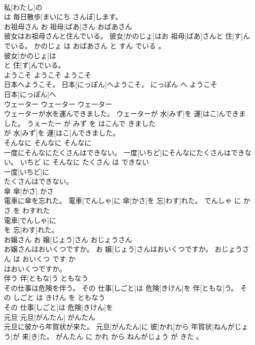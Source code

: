 \documentclass[8pt]{extreport}
\begin{document}
\begin{CJK}{UTF8}{min}
\\	私[わたし]の
\\	は 毎日散歩[まいにち さんぽ]します。			
\\	お祖母さん	お 祖母[ばあ]さん	おばあさん	
\\	彼女はお祖母さんと住んでいる。	彼女[かのじょ]はお 祖母[ばあ]さんと 住[す]んでいる。	かのじょ は おばあさん と すん でいる 。	
\\	彼女[かのじょ]は
\\	と 住[す]んでいる。			
\\	ようこそ	ようこそ	ようこそ	
\\	日本へようこそ。	日本[にっぽん]へようこそ。	にっぽん へ ようこそ	
\\	日本[にっぽん]へ
\\	ウェーター	ウェーター	ウェーター	
\\	ウェーターが水を運んできました。	ウェーターが 水[みず]を 運[はこ]んできました。	うぇーたー が みず を はこんで きました	
\\	が 水[みず]を 運[はこ]んできました。			
\\	そんなに	そんなに	そんなに	
\\	一度にそんなにたくさんはできない。	一度[いちど]にそんなにたくさんはできない。	いちど に そんなに たくさん は できない	
\\	一度[いちど]に
\\	たくさんはできない。			
\\	傘	傘[かさ]	かさ	
\\	電車に傘を忘れた。	電車[でんしゃ]に 傘[かさ]を 忘[わす]れた。	でんしゃ に かさ を わすれた	
\\	電車[でんしゃ]に
\\	を 忘[わす]れた。			
\\	お嬢さん	お 嬢[じょう]さん	おじょうさん	
\\	お嬢さんはおいくつですか。	お 嬢[じょう]さんはおいくつですか。	おじょうさん は おいくつ です か	
\\	はおいくつですか。			
\\	伴う	伴[ともな]う	ともなう	
\\	その仕事は危険を伴う。	その 仕事[しごと]は 危険[きけん]を 伴[ともな]う。	その しごと は きけん を ともなう	
\\	その 仕事[しごと]は 危険[きけん]を
\\	元旦	元旦[がんたん]	がんたん	
\\	元旦に彼から年賀状が来た。	元旦[がんたん]に 彼[かれ]から 年賀状[ねんがじょう]が 来[き]た。	がんたん に かれ から ねんがじょう が きた 。	

\end{CJK}
\end{document}
